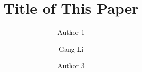 \documentclass{amsart}
\begin{document}
%
%
\title[A Short Running Title]{Title of This Paper}%

\author{Author 1}
\address[A.~1]{School of Computer Science,\\ 
Xi'an Shiyou University, Shaanxi 710065, China}%

\author{Gang Li}
\address[A.~2]{School of Information Technology \\
Deakin University, Geelong, Australia}%

\author{Author 3}
\address[A.~3]{School of Information Technology \\
Deakin University, 221 Burwood Highway \\
Vic 3125, Australia}%

%


\date{\gitAuthorDate}%




\maketitle
\tableofcontents

\newpage








\newpage



\listoftodos
\end{document}
